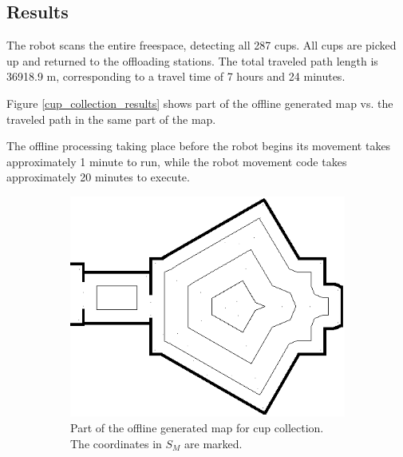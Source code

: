 \subsection{Results}
The robot scans the entire freespace, detecting all 287 cups.
All cups are picked up and returned to the offloading stations.
The total traveled path length is 36918.9 m, corresponding to a travel time of 7 hours and 24 minutes.

Figure \ref{cup_collection_results} shows part of the offline generated map vs. the traveled path in the same part of the map.

The offline processing taking place before the robot begins its movement takes approximately 1 minute
to run, while the robot movement code takes approximately 20 minutes to execute.

\begin{figure}[ht]
\centering
  \begin{subfigure}[t]{0.3\textwidth}
    \includegraphics[width = \textwidth]{graphics/cup_collect_plan}
    \caption{Part of the offline generated map for cup collection. The coordinates in \(S_{M}\) are marked.}
    \label{cup_collect_plan}
  \end{subfigure}
  \begin{subfigure}[t]{0.3\textwidth}

\end{subfigure}
\end{figure}
